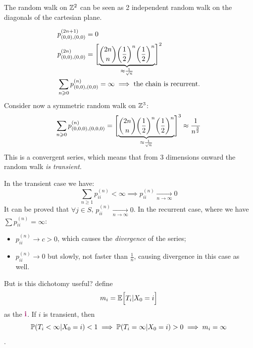 \documentclass{article}
\begin{document}
 \begin{minipage}{0.5\textwidth}
    \end{minipage} \hfill
    \begin{minipage}{0.45\textwidth}
    The random walk on $\mathbb{Z}^2$ can be seen as 2 independent random walk on the diagonals of the cartesian plane.
    \end{minipage}
\begin{align*}
    &p_{(0,0),(0,0)}^{(2n+1)}=0\\
    &p_{(0,0),(0,0)}^{(2n)}=\Biggl[\underbrace{\binom{2n}{n}\biggl(\frac{1}{2}\biggr)^n\biggl(\frac{1}{2}\biggr)^n}_{\mathclap{\approx \frac{1}{\sqrt{n}}}}\Biggr]^2\\
    &\sum_{n \geqslant 0}p_{(0,0),(0,0)}^{(n)}=\infty\implies\text{the chain is recurrent.}
\end{align*}
Consider now a symmetric random walk on $\mathbb{Z}^3$:
\[
    \sum_{n \geqslant 0}p_{(0,0,0),(0,0,0)}^{(n)}=\Biggl[\underbrace{\binom{2n}{n}\biggl(\frac{1}{2}\biggr)^n\biggl(\frac{1}{2}\biggr)^n}_{\mathclap{\approx \frac{1}{\sqrt{n}}}}\Biggr]^3\approx\frac{1}{n^{\frac{3}{2}}}
\]
This is a convergent series, which means that from 3 dimensions onward the random walk \textit{is transient}.

In the transient case we have:
\[
\sum_{n\geqslant 1}p_{ii}^{(n)}<\infty\implies p_{ii}^{(n)}\xrightarrow[n\rightarrow\infty]{}0
\]
It can be proved that $\forall j \in S$, $p_{ii}^{(n)}\xrightarrow[n\rightarrow\infty]{}0$. In the recurrent case, where we have $\sum p_{ii}^{(n)}=\infty$:
\begin{itemize}
    \item $p_{ii}^{(n)}\rightarrow c>0$, which causes the \textit{divergence} of the series;
    \item  $p_{ii}^{(n)}\rightarrow 0$ but slowly, not faster than $\frac{1}{n}$, causing divergence in this case as well.
\end{itemize}
But is this dichotomy useful? define
\[m_i=\mathbb{E}\Bigl[{T_i|X_0=i}\Bigr]\] as the  $\enf{i}$. If $i$ is transient, then \[\mathbb{P}(T_i<\infty|X_0=i)<1\implies\mathbb{P}(T_i=\infty|X_0=i)>0\implies m_i=\infty\].
\end{document}
